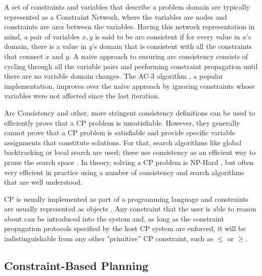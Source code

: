 A set of constraints and variables that describe a problem domain are
typically represented as a Constraint Network, where the variables are
nodes and constraints are arcs between the variables. Having this
network representation in mind, a pair of variables $x,y$ is said to
be arc consistent if for every value in $x$'s domain, there is a value
in $y$'s domain that is consistent with all the constraints that
connect $x$ and $y$.  A naive approach to ensuring arc consistency
consists of cycling through all the variable pairs and performing
constraint propagation until there are no variable domain changes. The
AC-3 algorithm \cite{mackworth77}, a popular implementation, improves
over the naive approach by ignoring constraints whose variables were
not affected since the last iteration. 

Arc Consistency and other, more stringent consistency definitions can
be used to efficiently prove that a \textsf{CP} problem is
unsatisfiable. However, they generally cannot prove that a \textsf{CP}
problem is satisfiable and provide specific variable assignments that
constitute solutions. For that, search algorithms like global
backtracking \cite{hooker05} or local search are used; these use
consistency as an efficient way to prune the search space
\cite{cp06}. In theory, solving a \textsf{CP} problem is NP-Hard
\cite{ghallab04}, but often very efficient in practice using a number
of consistency and search algorithms that are well understood.

\textsf{CP} is usually implemented as part of a programming language
and constraints are usually represented as objects \cite{puget95}. Any
constraint that the user is able to reason about can be introduced
into the system and, as long as the constraint propagation protocols
specified by the host \textsf{CP} system are enforced, it will be
indistinguishable from any other "primitive'' \textsf{CP} constraint,
such as $\leq$ or $\geq$.

\subsection{Constraint-Based Planning}
\label{sec:europa:cp}

